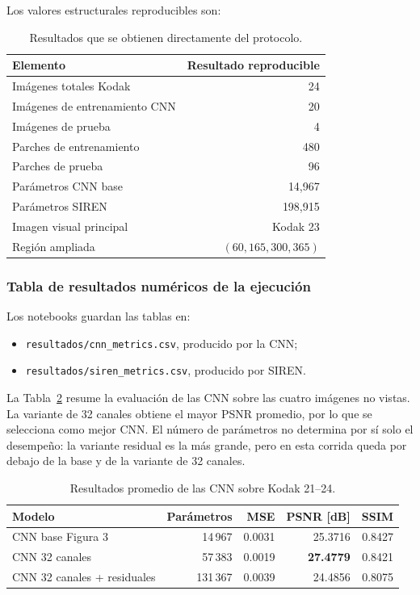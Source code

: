 \documentclass[11pt,a4paper]{article}
\begin{document}
Los valores estructurales reproducibles son:

\begin{table}[H]
\centering
\caption{Resultados que se obtienen directamente del protocolo.}
\label{tab:reproducible}
\begin{tabular}{lr}
\toprule
Elemento & Resultado reproducible\\
\midrule
Imágenes totales Kodak & 24\\
Imágenes de entrenamiento CNN & 20\\
Imágenes de prueba & 4\\
Parches de entrenamiento & 480\\
Parches de prueba & 96\\
Parámetros CNN base & 14,967\\
Parámetros SIREN & 198,915\\
Imagen visual principal & Kodak 23\\
Región ampliada & $(60,165,300,365)$\\
\bottomrule
\end{tabular}
\end{table}

\subsubsection{Tabla de resultados numéricos de la ejecución}

Los notebooks guardan las tablas en:

\begin{itemize}
    \item \texttt{resultados/cnn\_metrics.csv}, producido por la CNN;
    \item \texttt{resultados/siren\_metrics.csv}, producido por SIREN.
\end{itemize}

La Tabla~\ref{tab:cnn-summary-results} resume la evaluación de las CNN sobre las cuatro imágenes no vistas. La variante de 32 canales obtiene el mayor PSNR promedio, por lo que se selecciona como mejor CNN. El número de parámetros no determina por sí solo el desempeño: la variante residual es la más grande, pero en esta corrida queda por debajo de la base y de la variante de 32 canales.

\begin{table}[H]
\centering
\caption{Resultados promedio de las CNN sobre Kodak 21--24.}
\label{tab:cnn-summary-results}
\scriptsize
\begin{tabular}{p{5.0cm}rrrr}
\toprule
Modelo & Parámetros & MSE & PSNR [dB] & SSIM\\
\midrule
CNN base Figura 3 & 14\,967 & 0.0031 & 25.3716 & 0.8427\\
CNN 32 canales & 57\,383 & 0.0019 & \textbf{27.4779} & 0.8421\\
CNN 32 canales + residuales & 131\,367 & 0.0039 & 24.4856 & 0.8075\\
\bottomrule
\end{tabular}
\end{table}
\end{document}
